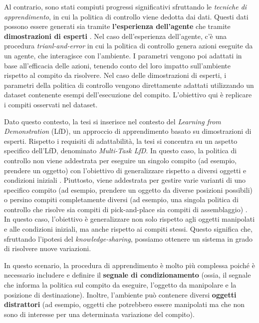 Al contrario, sono stati compiuti progressi significativi sfruttando le \textit{tecniche di apprendimento}, in cui la politica di controllo viene dedotta dai dati. Questi dati possono essere generati sia tramite \textbf{l'esperienza dell'agente} \cite{sutton2018reinforcement} che tramite \textbf{dimostrazioni di esperti} \cite{osa2018algorithmic}.
\newline Nel caso dell'esperienza dell'agente, c'è una procedura \textit{trianl-and-error} in cui la politica di controllo genera azioni eseguite da un agente, che interagisce con l'ambiente. I parametri vengono poi adattati in base all'efficacia delle azioni, tenendo conto del loro impatto sull'ambiente rispetto al compito da risolvere.
\newline Nel caso delle dimostrazioni di esperti, i parametri della politica di controllo vengono direttamente adattati utilizzando un dataset contenente esempi dell'esecuzione del compito. L'obiettivo qui è replicare i compiti osservati nel dataset.

Dato questo contesto, la tesi si inserisce nel contesto del \textit{Learning from Demonstration} (LfD), un approccio di apprendimento basato su dimostrazioni di esperti. Rispetto i requisiti di adattabilità, la tesi si concentra su un aspetto specifico dell'LfD, denominato \textit{Multi-Task LfD}. In questo caso, la politica di controllo non viene addestrata per eseguire un singolo compito (ad esempio, prendere un oggetto) con l'obiettivo di generalizzare rispetto a diversi oggetti e condizioni iniziali \cite{zhang2018deep_vr_teleoperation,mandlekar2022matters}. Piuttosto, viene addestrata per gestire varie varianti di uno specifico compito (ad esempio, prendere un oggetto da diverse posizioni possibili) \cite{dasari2021transformers_one_shot} o persino compiti completamente diversi (ad esempio, una singola politica di controllo che risolve sia compiti di pick-and-place sia compiti di assemblaggio) \cite{brohan2022rt,mandi2022towards_more_generalizable_one_shot}. In questo caso, l'obiettivo è generalizzare non solo rispetto agli oggetti manipolati e alle condizioni iniziali, ma anche rispetto ai compiti stessi. Questo significa che, sfruttando l'ipotesi del \textit{knowledge-sharing}, possiamo ottenere un sistema in grado di risolvere nuove variazioni.

In questo scenario, la procedura di apprendimento è molto più complessa poiché è necessario includere e definire il \textbf{segnale di condizionamento} (ossia, il segnale che informa la politica sul compito da eseguire, l'oggetto da manipolare e la posizione di destinazione). Inoltre, l'ambiente può contenere diversi \textbf{oggetti distrattori} (ad esempio, oggetti che potrebbero essere manipolati ma che non sono di interesse per una determinata variazione del compito).

